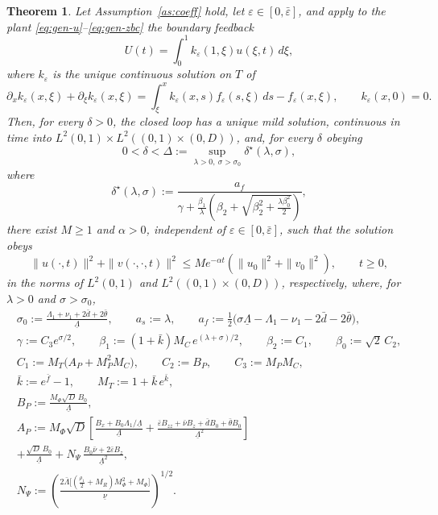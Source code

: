 \documentclass[12pt]{article}
\theoremstyle{plain}
\newtheorem{theorem}{Theorem}
\theoremstyle{remark}
\newcommand{\uL}{\underline\Lambda}
\newcommand{\un}{\underline\nu}
\begin{document}
\begin{theorem}\label{thm:main}
Let Assumption~\ref{as:coeff} hold, let $\varepsilon\in[0,\bar\varepsilon]$, and apply to the plant \eqref{eq:gen-u}--\eqref{eq:gen-zbc} the boundary feedback
\begin{equation}
 U(t)=\int_0^1k_\varepsilon(1,\xi)u(\xi,t)\,d\xi ,
 \label{eq:genU}
\end{equation}
where $k_\varepsilon$ is the unique continuous solution on $T$ of
\begin{equation}
 \partial_xk_\varepsilon(x,\xi)+\partial_\xi k_\varepsilon(x,\xi)
 =\int_\xi^xk_\varepsilon(x,s)f_\varepsilon(s,\xi)\,ds-f_\varepsilon(x,\xi),
 \qquad k_\varepsilon(x,0)=0.
 \label{eq:genq}
\end{equation}
Then, for every $\delta>0$, the closed loop has a unique mild solution, continuous in time into $L^2(0,1)\times L^2((0,1)\times(0,D))$, and, for every $\delta$ obeying
\begin{equation}
 0<\delta<\Delta:=\sup_{\lambda>0,\ \sigma>\sigma_0}\delta^\star(\lambda,\sigma),
 \label{eq:deltarange}
\end{equation}
where
\begin{equation}
 \delta^\star(\lambda,\sigma)
 :=
 \frac{a_f}
 {\displaystyle
 \gamma+\frac{\beta_1}{\lambda}
 \left(\beta_2+\sqrt{\beta_2^2+\frac{\lambda\beta_0^2}{2}}\right)} ,
 \label{eq:deltastar}
\end{equation}
there exist $M\ge1$ and $\alpha>0$, independent of $\varepsilon\in[0,\bar\varepsilon]$, such that the solution obeys
\begin{equation}
 \|u(\cdot,t)\|^2+\|v(\cdot,\cdot,t)\|^2
 \le
 M e^{-\alpha t}
 \left(\|u_0\|^2+\|v_0\|^2\right),
 \qquad t\ge0 ,
 \label{eq:mainestimate}
\end{equation}
in the norms of $L^2(0,1)$ and $L^2((0,1)\times(0,D))$, respectively, where, for $\lambda>0$ and $\sigma>\sigma_0$,
\begin{gather}
 \sigma_0:=\frac{\Lambda_1+\nu_1+2\bar d+2\bar\theta}{\uL},
 \qquad
 a_s:=\lambda,
 \qquad
 a_f:=\tfrac12\big(\sigma\uL-\Lambda_1-\nu_1-2\bar d-2\bar\theta\big),
 \label{eq:asaf}\\
 \gamma:=C_3e^{\sigma/2},
 \qquad
 \beta_1:=(1+\bar k)M_C\,e^{(\lambda+\sigma)/2},
 \qquad
 \beta_2:=C_1,
 \qquad
 \beta_0:=\sqrt2\,C_2 ,
 \label{eq:betas}\\
 C_1:=M_T\big(A_P+M_P^2M_C\big),
 \qquad
 C_2:=B_P,
 \qquad
 C_3:=M_PM_C ,
 \label{eq:C123}\\
 \bar k:=e^{\bar f}-1,
 \qquad
 M_T:=1+\bar k\,e^{\bar k},
 \label{eq:kbarMT}\\
 B_P:=\frac{M_\Phi\sqrt D\,B_0}{\uL},
 \label{eq:BP}\\
 A_P:=M_\Phi\sqrt D\left[
 \frac{B_x+B_0\Lambda_1/\uL}{\uL}
 +\frac{\bar\varepsilon B_{zz}+\bar\nu B_z+\bar dB_0+\bar\theta B_0}{\uL^2}
 \right]
 \nonumber\\
 +\frac{\sqrt D\,B_0}{\uL}
 +N_\Psi\,\frac{B_0\bar\nu+2\bar\varepsilon B_z}{\uL^2},
 \label{eq:AP}\\
 N_\Psi:=\left(\frac{2\bar\Lambda\big[(\tfrac{\rho_1}{2}+M_R)M_\Phi^2+M_\Phi\big]}{\un}\right)^{1/2}.
 \label{eq:NPsi}
\end{gather}
\end{theorem}
\end{document}
